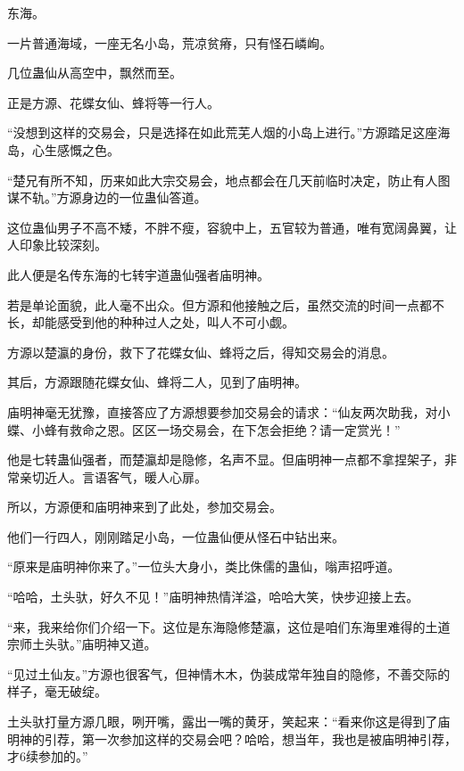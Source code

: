 
\begin{this_body}



东海。

一片普通海域，一座无名小岛，荒凉贫瘠，只有怪石嶙峋。

几位蛊仙从高空中，飘然而至。

正是方源、花蝶女仙、蜂将等一行人。

“没想到这样的交易会，只是选择在如此荒芜人烟的小岛上进行。”方源踏足这座海岛，心生感慨之色。

“楚兄有所不知，历来如此大宗交易会，地点都会在几天前临时决定，防止有人图谋不轨。”方源身边的一位蛊仙答道。

这位蛊仙男子不高不矮，不胖不瘦，容貌中上，五官较为普通，唯有宽阔鼻翼，让人印象比较深刻。

此人便是名传东海的七转宇道蛊仙强者庙明神。

若是单论面貌，此人毫不出众。但方源和他接触之后，虽然交流的时间一点都不长，却能感受到他的种种过人之处，叫人不可小觑。

方源以楚瀛的身份，救下了花蝶女仙、蜂将之后，得知交易会的消息。

其后，方源跟随花蝶女仙、蜂将二人，见到了庙明神。

庙明神毫无犹豫，直接答应了方源想要参加交易会的请求：“仙友两次助我，对小蝶、小蜂有救命之恩。区区一场交易会，在下怎会拒绝？请一定赏光！”

他是七转蛊仙强者，而楚瀛却是隐修，名声不显。但庙明神一点都不拿捏架子，非常亲切近人。言语客气，暖人心扉。

所以，方源便和庙明神来到了此处，参加交易会。

他们一行四人，刚刚踏足小岛，一位蛊仙便从怪石中钻出来。

“原来是庙明神你来了。”一位头大身小，类比侏儒的蛊仙，嗡声招呼道。

“哈哈，土头驮，好久不见！”庙明神热情洋溢，哈哈大笑，快步迎接上去。

“来，我来给你们介绍一下。这位是东海隐修楚瀛，这位是咱们东海里难得的土道宗师土头驮。”庙明神又道。

“见过土仙友。”方源也很客气，但神情木木，伪装成常年独自的隐修，不善交际的样子，毫无破绽。

土头驮打量方源几眼，咧开嘴，露出一嘴的黄牙，笑起来：“看来你这是得到了庙明神的引荐，第一次参加这样的交易会吧？哈哈，想当年，我也是被庙明神引荐，才6续参加的。”


\end{this_body}
